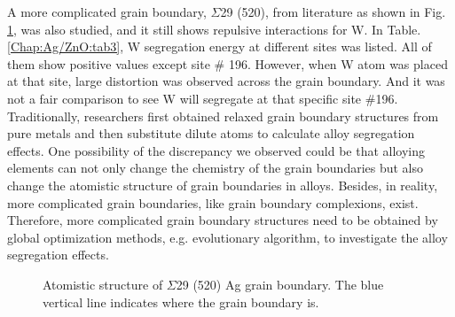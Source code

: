 A more complicated grain boundary, $\Sigma$29 (520), from literature \cite{zhu2018predicting} as shown in Fig. \ref{Chap:Ag/ZnO:fig20}, was also studied, and it still shows repulsive interactions for W. In Table. \ref{Chap:Ag/ZnO:tab3}, W segregation energy at different sites was listed. All of them show positive values except site \# 196. However, when W atom was placed at that site, large distortion was observed across the grain boundary. And it was not a fair comparison to see W will segregate at that specific site \#196.  Traditionally, researchers first obtained relaxed grain boundary structures from pure metals and then substitute dilute atoms to calculate alloy segregation effects. One possibility of the discrepancy we observed could be that alloying elements can not only change the chemistry of the grain boundaries but also change the atomistic structure of grain boundaries in alloys. Besides, in reality, more complicated grain boundaries, like grain boundary complexions, exist. \cite{cantwell2014grain} Therefore, more complicated grain boundary structures need to be obtained by global optimization methods, e.g. evolutionary algorithm, to investigate the alloy segregation effects.


\begingroup
\begin{figure}[!ht]
  \centering
  \caption[Atomistic structure of $\Sigma$29 (520) Ag grain boundary.]{Atomistic structure of $\Sigma$29 (520) Ag grain boundary. The blue vertical line indicates where the grain boundary is.}
  \label{Chap:Ag/ZnO:fig20}
\end{figure}
\endgroup

